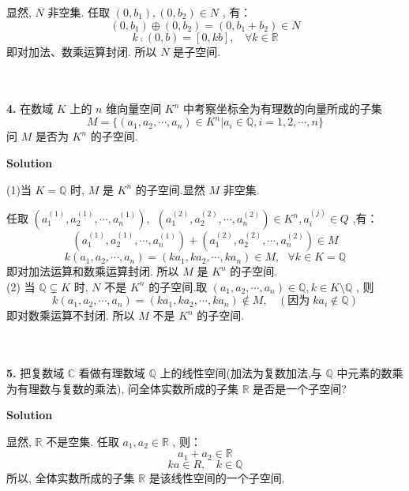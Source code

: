 \documentclass[11pt,a4paper,openany,oneside]{book}
\newcommand\Solution{\noindent\textbf{\textsf{Solution}}\par\medskip}
\begin{document}
显然,  $ N $ 非空集. 任取 $ (0, b_1), (0, b_2) \in N $ , 有：
 $$  (0, b_1) \oplus  (0, b_2) = (0, b_1 + b_2) \in N  $$ 
 $$  k \comp (0, b) = \left[ 0, kb \right], \ \ \ \ \forall k \in \mathbb{R}  $$  即对加法、数乘运算封闭. 所以 $ N $ 是子空间. \\  \\  \\

\begin{myexample}
	\textbf{4.} 
在数域 $ K $ 上的 $ n $ 维向量空间 $ K^n $ 中考察坐标全为有理数的向量所成的子集
 $$  M = \{(a_1, a_2, \cdots, a_n) \in K^n | a_i \in \mathbb{Q}, i = 1, 2, \cdots, n  \}  $$ 
问 $ M $ 是否为 $ K^n $ 的子空间. 
\end{myexample}
\Solution 

(1)当 $ K = \mathbb{Q}  $ 时,  $ M $ 是 $ K^n $ 的子空间.显然 $ M $ 非空集.

任取 $ (a_1^{(1)}, a_2^{(1)}, \cdots, a_n^{(1)}),\ \  (a_1^{(2)}, a_2^{(2)}, \cdots, a_n^{(2)}) \in K^n, a_i^{(j)} \in Q  $ ,有：
 $$  (a_1^{(1)}, a_2^{(1)}, \cdots, a_n^{(1)}) + (a_1^{(2)}, a_2^{(2)}, \cdots, a_n^{(2)}) \in M  $$ 
 $$  k(a_1, a_2, \cdots, a_n) =  (ka_1, ka_2, \cdots, ka_n)\in M, \ \ \ \forall k \in K = \mathbb{Q}  $$ 
即对加法运算和数乘运算封闭. 所以 $ M $ 是 $ K^n $ 的子空间.  \\ 

(2) 当 $ \mathbb{Q} \subsetneq K $ 时,  $ N $ 不是 $ K^n $ 的子空间.取 $ (a_1, a_2, \cdots, a_n) \in \mathbb{Q}, k \in K \setminus \mathbb{Q} $ , 则
 $$  k(a_1, a_2, \cdots, a_n) = (ka_1, ka_2, \cdots, ka_n) \notin M, \ \ \ \ (\text{因为} \;ka_i \notin \mathbb{Q})  $$ 
即对数乘运算不封闭. 所以 $ M $ 不是 $ K^n $ 的子空间.  \\  \\  \\


\begin{myexample}
	\textbf{5.} 
把复数域 $ \mathbb{C} $ 看做有理数域 $ \mathbb{Q} $ 上的线性空间(加法为复数加法,与 $ \mathbb{Q} $ 中元素的数乘为有理数与复数的乘法), 问全体实数所成的子集 $ \mathbb{R} $ 是否是一个子空间? 
\end{myexample}
\Solution 

显然,  $ \mathbb{R} $ 不是空集. 任取 $ a_1, a_2 \in \mathbb{R} $ , 则：
 $$  a_1 + a_2 \in \mathbb{R}  $$ 
 $$  ka \in R, \ \ \ \ k \in \mathbb{Q}  $$ 
所以, 全体实数所成的子集 $ \mathbb{R} $ 是该线性空间的一个子空间.   \\  \\   \\ 
\end{document}
